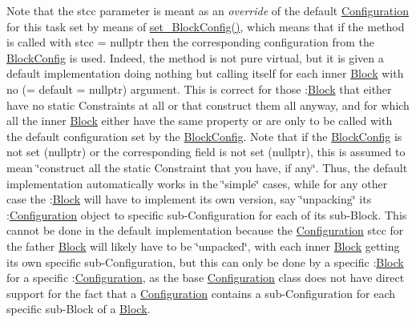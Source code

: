Note that the stcc parameter is meant as an {\itshape override} of the default \mbox{\hyperlink{class_s_m_spp__di__unipi__it_1_1_configuration}{Configuration}} for this task set by means of \mbox{\hyperlink{class_s_m_spp__di__unipi__it_1_1_block_a18d411b740a47db00d15083c5c7ef2ba}{set\+\_\+\+Block\+Config()}}, which means that if the method is called with stcc = nullptr then the corresponding configuration from the \mbox{\hyperlink{class_s_m_spp__di__unipi__it_1_1_block_config}{Block\+Config}} is used. Indeed, the method is not pure virtual, but it is given a default implementation doing nothing but calling itself for each inner \mbox{\hyperlink{class_s_m_spp__di__unipi__it_1_1_block}{Block}} with no (= default = nullptr) argument. This is correct for those \+:\mbox{\hyperlink{class_s_m_spp__di__unipi__it_1_1_block}{Block}} that either have no static Constraints at all or that construct them all anyway, and for which all the inner \mbox{\hyperlink{class_s_m_spp__di__unipi__it_1_1_block}{Block}} either have the same property or are only to be called with the default configuration set by the \mbox{\hyperlink{class_s_m_spp__di__unipi__it_1_1_block_config}{Block\+Config}}. Note that if the \mbox{\hyperlink{class_s_m_spp__di__unipi__it_1_1_block_config}{Block\+Config}} is not set (nullptr) or the corresponding field is not set (nullptr), this is assumed to mean \char`\"{}construct all the static
\+Constraint that you have, if any\char`\"{}. Thus, the default implementation automatically works in the \char`\"{}simple\char`\"{} cases, while for any other case the \+:\mbox{\hyperlink{class_s_m_spp__di__unipi__it_1_1_block}{Block}} will have to implement its own version, say \char`\"{}unpacking\char`\"{} its \+:\mbox{\hyperlink{class_s_m_spp__di__unipi__it_1_1_configuration}{Configuration}} object to specific sub-\/\+Configuration for each of its sub-\/\+Block. This cannot be done in the default implementation because the \mbox{\hyperlink{class_s_m_spp__di__unipi__it_1_1_configuration}{Configuration}} stcc for the father \mbox{\hyperlink{class_s_m_spp__di__unipi__it_1_1_block}{Block}} will likely have to be \char`\"{}unpacked\char`\"{}, with each inner \mbox{\hyperlink{class_s_m_spp__di__unipi__it_1_1_block}{Block}} getting its own specific sub-\/\+Configuration, but this can only be done by a specific \+:\mbox{\hyperlink{class_s_m_spp__di__unipi__it_1_1_block}{Block}} for a specific \+:\mbox{\hyperlink{class_s_m_spp__di__unipi__it_1_1_configuration}{Configuration}}, as the base \mbox{\hyperlink{class_s_m_spp__di__unipi__it_1_1_configuration}{Configuration}} class does not have direct support for the fact that a \mbox{\hyperlink{class_s_m_spp__di__unipi__it_1_1_configuration}{Configuration}} contains a sub-\/\+Configuration for each specific sub-\/\+Block of a \mbox{\hyperlink{class_s_m_spp__di__unipi__it_1_1_block}{Block}}. \mbox{\label{class_s_m_spp__di__unipi__it_1_1_block_acd79fd0980af547f2f06241cb989094e}} 
